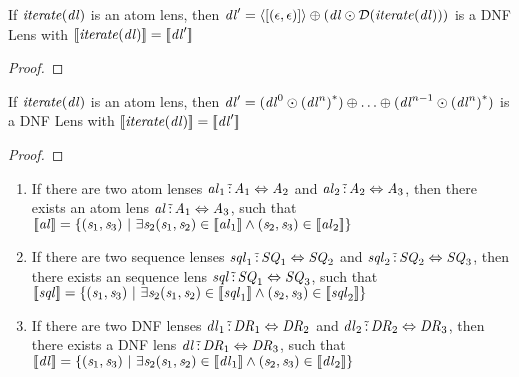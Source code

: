 \documentclass[numbers,10pt,preprint\ifanon ,nocopyrightspace\fi]{sigplanconf}
\begin{document}
\begin{lemma}
  \label{lem:iterate-lens-unroll}
  If $\mathit{\mathit{iterate}(\mathit{dl})}$ is an atom lens, then
  $\mathit{dl}' = \langle[(\epsilon,\epsilon)]\rangle \oplus (\mathit{dl}
  \odot \mathcal{D}(\mathit{\mathit{iterate}(\mathit{dl})}))$ is a DNF Lens with
  $[ \! [\mathit{\mathit{iterate}(\mathit{dl})}] \! ] = [ \! [\mathit{dl}'] \! ]$
\end{lemma}
\begin{proof}
\end{proof}

\begin{lemma}
  \label{lem:iterate-lens-quotient}
  If $\mathit{\mathit{iterate}(\mathit{dl})}$ is an atom lens, then
  $\mathit{dl}' = (\mathit{dl}^0 \odot {(\ensuremath{\mathit{dl}}^n)}^*) \oplus \ldots \oplus
  (\mathit{dl}^{n-1} \odot {(\ensuremath{\mathit{dl}}^n)}^*)$ is a DNF Lens with
  $[ \! [\mathit{\mathit{iterate}(\mathit{dl})}] \! ] = [ \! [\mathit{dl}'] \! ]$
\end{lemma}
\begin{proof}
\end{proof}

\begin{lemma}
  \leavevmode
  \label{lem:composition-completeness}
  \begin{enumerate}
  \item If there are two atom lenses
    $\mathit{al}_1 \,\tilde{:}\, \mathit{A}_1 \Leftrightarrow \mathit{A}_2$ and
    $\mathit{al}_2 \,\tilde{:}\, \mathit{A}_2 \Leftrightarrow \mathit{A}_3$,
    then there exists an atom lens
    $\mathit{al} \,\tilde{:}\, \mathit{A}_1 \Leftrightarrow \mathit{A}_3$, such that
    $[ \! [\mathit{al}] \! ]=\{(\mathit{s}_1,\mathit{s}_3)~|~
      \exists\mathit{s}_2
      (\mathit{s}_1,\mathit{s}_2)\in[ \! [\mathit{al}_1] \! ]\wedge
      (\mathit{s}_2,\mathit{s}_3)\in[ \! [\mathit{al}_2] \! ]\}$

  \item If there are two sequence lenses
    $\mathit{sql}_1 \,\tilde{:}\, \mathit{SQ}_1 \Leftrightarrow \mathit{SQ}_2$ and
    $\mathit{sql}_2 \,\tilde{:}\, \mathit{SQ}_2 \Leftrightarrow \mathit{SQ}_3$,
    then there exists an sequence lens
    $\mathit{sql} \,\tilde{:}\, \mathit{SQ}_1 \Leftrightarrow \mathit{SQ}_3$, such that
    $[ \! [\mathit{sql}] \! ]=\{(\mathit{s}_1,\mathit{s}_3)~|~
      \exists\mathit{s}_2
      (\mathit{s}_1,\mathit{s}_2)\in[ \! [\mathit{sql}_1] \! ]\wedge
      (\mathit{s}_2,\mathit{s}_3)\in[ \! [\mathit{sql}_2] \! ]\}$

  \item If there are two DNF lenses
    $\mathit{dl}_1 \,\tilde{:}\, \mathit{DR}_1 \Leftrightarrow \mathit{DR}_2$ and
    $\mathit{dl}_2 \,\tilde{:}\, \mathit{DR}_2 \Leftrightarrow \mathit{DR}_3$,
    then there exists a DNF lens
    $\mathit{dl} \,\tilde{:}\, \mathit{DR}_1 \Leftrightarrow \mathit{DR}_3$, such that
    $[ \! [\mathit{dl}] \! ]=\{(\mathit{s}_1,\mathit{s}_3)~|~
      \exists\mathit{s}_2
      (\mathit{s}_1,\mathit{s}_2)\in[ \! [\mathit{dl}_1] \! ]\wedge
      (\mathit{s}_2,\mathit{s}_3)\in[ \! [\mathit{dl}_2] \! ]\}$
  \end{enumerate}
\end{lemma}
\end{document}
